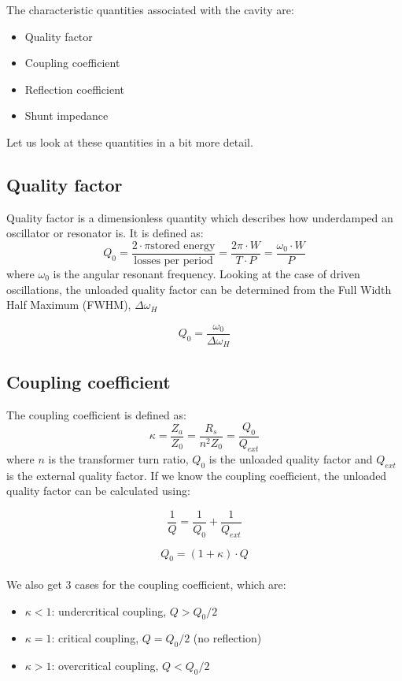 \documentclass[a4paper]{report}
\numberwithin{equation}{section}
\begin{document}
The characteristic quantities associated with the cavity are:
\begin{itemize}
		\item Quality factor 
		\item Coupling coefficient 
		\item Reflection coefficient 
		\item Shunt impedance
\end{itemize}

Let us look at these quantities in a bit more detail. 

\subsection{Quality factor}
Quality factor is a dimensionless quantity which describes how underdamped an
oscillator or resonator is. It is defined as: 
\begin{equation}
		Q_{0} = \frac{2 \cdot \pi \text{stored energy} }{\text{losses per period}} = \frac{2 \pi \cdot W }{T\cdot P} =  \frac{\omega_{0}\cdot W}{P}
\end{equation}
where $\omega_{0}$ is the angular resonant frequency. Looking at the case of
driven oscillations, the unloaded quality factor can be determined from the Full
Width Half Maximum (FWHM), $\Delta \omega_{H}$

\begin{equation} \label{eqn:fwhm}
		Q_{0} = \frac{\omega_{0}}{\Delta \omega_{H}}
\end{equation}

\subsection{Coupling coefficient}
The coupling coefficient is defined as:
\begin{equation} \label{eqn:coupling}
		\kappa = \frac{Z_{a}}{Z_{0}} = \frac{R_{s}}{n^2Z_{0}} = \frac{Q_{0}}{Q_{ext}}	
\end{equation}
where $n$ is the transformer turn ratio, $Q_{0}$ is the unloaded quality factor
and $Q_{ext}$ is the external quality factor.  
If we know the coupling coefficient, the unloaded quality factor can be
calculated using: 

\[
		\frac{1}{Q} = \frac{1}{Q_{0}} + \frac{1}{Q_{ext}}
\]

\begin{equation} \label{eqn:quality}
		Q_{0} = \left(1 + \kappa\right)\cdot Q
\end{equation}
\\
We also get 3 cases for the coupling coefficient, which are: 
\begin{itemize}
		\item $\kappa < 1$: undercritical coupling, $Q>Q_{0}/2$
		\item $\kappa = 1$: critical coupling, $Q = Q_{0}/2$ (no reflection)
		\item $\kappa > 1$: overcritical coupling, $Q<Q_{0}/2$ 
\end{itemize}
\end{document}
